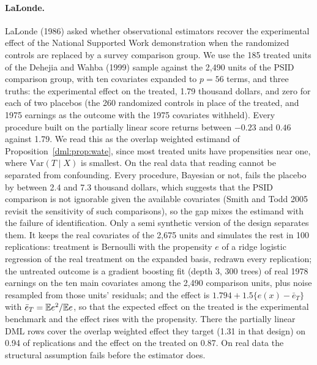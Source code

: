 \paragraph{LaLonde.} LaLonde (1986) asked whether observational estimators recover the experimental effect of the National Supported Work demonstration when the randomized controls are replaced by a survey comparison group. We use the 185 treated units of the Dehejia and Wahba (1999) sample against the 2,490 units of the PSID comparison group, with ten covariates expanded to $p = 56$ terms, and three truths: the experimental effect on the treated, 1.79 thousand dollars, and zero for each of two placebos (the 260 randomized controls in place of the treated, and 1975 earnings as the outcome with the 1975 covariates withheld). Every procedure built on the partially linear score returns between $-0.23$ and $0.46$ against 1.79. We read this as the overlap weighted estimand of Proposition~\ref{dml:prop:wate}, since most treated units have propensities near one, where $\mathrm{Var}(T \mid X)$ is smallest. On the real data that reading cannot be separated from confounding. Every procedure, Bayesian or not, fails the placebo by between 2.4 and 7.3 thousand dollars, which suggests that the PSID comparison is not ignorable given the available covariates (Smith and Todd 2005 revisit the sensitivity of such comparisons), so the gap mixes the estimand with the failure of identification. Only a semi synthetic version of the design separates them. It keeps the real covariates of the 2,675 units and simulates the rest in 100 replications: treatment is Bernoulli with the propensity $e$ of a ridge logistic regression of the real treatment on the expanded basis, redrawn every replication; the untreated outcome is a gradient boosting fit (depth 3, 300 trees) of real 1978 earnings on the ten main covariates among the 2,490 comparison units, plus noise resampled from those units' residuals; and the effect is $1.794 + 1.5\{e(x) - \bar e_T\}$ with $\bar e_T = \mathbb{E} e^2/\mathbb{E} e$, so that the expected effect on the treated is the experimental benchmark and the effect rises with the propensity. There the partially linear DML rows cover the overlap weighted effect they target (1.31 in that design) on 0.94 of replications and the effect on the treated on 0.87. On real data the structural assumption fails before the estimator does.

